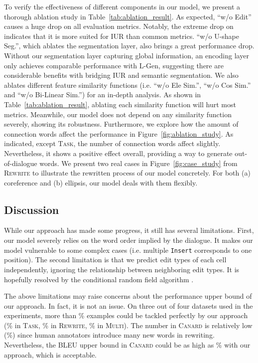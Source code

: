 \documentclass[11pt,a4paper]{article}
\begin{document}
To verify the effectiveness of different components in our model, we present a thorough ablation study in Table~\ref{tab:ablation_result}. As expected, ``w/o Edit'' causes a huge drop on all evaluation metrics. Notably, the extreme drop on  indicates that it is more suited for IUR than common metrics. ``w/o U-shape Seg.'', which ablates the segmentation layer, also brings a great performance drop. Without our segmentation layer capturing global information, an encoding layer only achieves comparable performance with L-Gen, suggesting there are considerable benefits with bridging IUR and semantic segmentation. We also ablates different feature similarity functions (i.e. ``w/o Ele Sim.'', ``w/o Cos Sim.'' and ``w/o Bi-Linear Sim.'') for an in-depth analysis. As shown in Table~\ref{tab:ablation_result}, ablating each similarity function will hurt most metrics. Meanwhile, our model does not depend on any similarity function severely, showing its robustness. Furthermore, we explore how the amount of connection words affect the performance in Figure~\ref{fig:ablation_study}. As indicated, except \textsc{Task}, the number of connection words affect slightly. Nevertheless, it shows a positive effect overall, providing a way to generate out-of-dialogue words. We present two real cases in Figure~\ref{fig:case_study} from \textsc{Rewrite} to illustrate the rewritten process of our model concretely. For both (a) coreference and (b) ellipsis, our model deals with them flexibly.


\subsection{Discussion}

While our approach has made some progress, it still has several limitations. First, our model severely relies on the word order implied by the dialogue. It makes our model vulnerable to some complex cases (i.e. multiple {\small\texttt{Insert}} corresponds to one position). The second limitation is that we predict edit types of each cell independently, ignoring the relationship between neighboring edit types. It is hopefully resolved by the conditional random field algorithm \cite{anurag_2017_crf}. 

The above limitations may raise concerns about the performance upper bound of our approach. In fact, it is not an issue. On three out of four datasets used in the experiments, more than \% examples could be tackled perfectly by our approach (\% in \textsc{Task}, \% in \textsc{Rewrite}, \% in \textsc{Multi}). The number in \textsc{Canard} is relatively low (\%) since human annotators introduce many new words in rewriting. Nevertheless, the BLEU upper bound in \textsc{Canard} could be as high as \% with our approach, which is acceptable.
\end{document}
